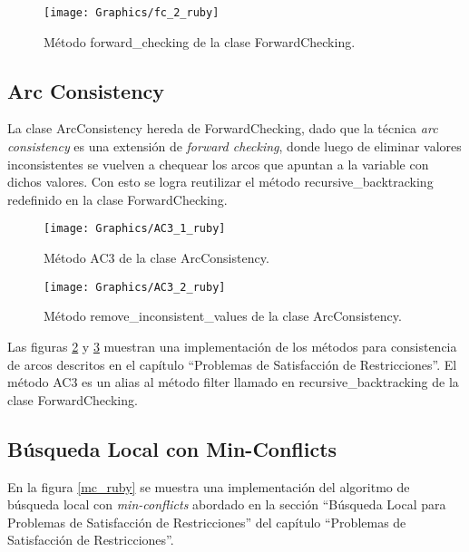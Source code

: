 \begin{figure}[h]
	\begin{center}
		\texttt{[image: Graphics/fc\_2\_ruby]}
		\caption{M\'etodo \textsf{forward\_checking} de la clase \textsf{ForwardChecking}.}
		\label{fc_2_ruby}
	\end{center}	
\end{figure}

\subsection{Arc Consistency}

La clase \textsf{ArcConsistency} hereda de \textsf{ForwardChecking}, dado que la t\'ecnica \emph{arc consistency} es una extensi\'on de \emph{forward checking}, donde luego de eliminar valores inconsistentes se vuelven a chequear los arcos que apuntan a la variable con dichos valores. Con esto se logra reutilizar el m\'etodo \textsf{recursive\_backtracking} redefinido en la clase \textsf{ForwardChecking}.

\begin{figure}[h]
	\begin{center}
		\texttt{[image: Graphics/AC3\_1\_ruby]}
		\caption{M\'etodo \textsf{AC3} de la clase \textsf{ArcConsistency}.}
		\label{AC3_1_ruby}
	\end{center}	
\end{figure}

\begin{figure}[h]
	\begin{center}
		\texttt{[image: Graphics/AC3\_2\_ruby]}
		\caption{M\'etodo \textsf{remove\_inconsistent\_values} de la clase \textsf{ArcConsistency}.}
		\label{AC3_2_ruby}
	\end{center}	
\end{figure}

Las figuras \ref{AC3_1_ruby} y \ref{AC3_2_ruby} muestran una implementaci\'on de los m\'etodos para consistencia de arcos descritos en el cap\'itulo ``Problemas de Satisfacci\'on de Restricciones''. El m\'etodo \textsf{AC3} es un alias al m\'etodo \textsf{filter} llamado en \textsf{recursive\_backtracking} de la clase \textsf{ForwardChecking}.

\subsection{B\'usqueda Local con Min-Conflicts}

En la figura \ref{mc_ruby} se muestra una implementaci\'on del algoritmo de b\'usqueda local con \emph{min-conflicts} abordado en la secci\'on ``B\'usqueda Local para Problemas de Satisfacci\'on de Restricciones'' del cap\'itulo ``Problemas de Satisfacci\'on de Restricciones''. 

